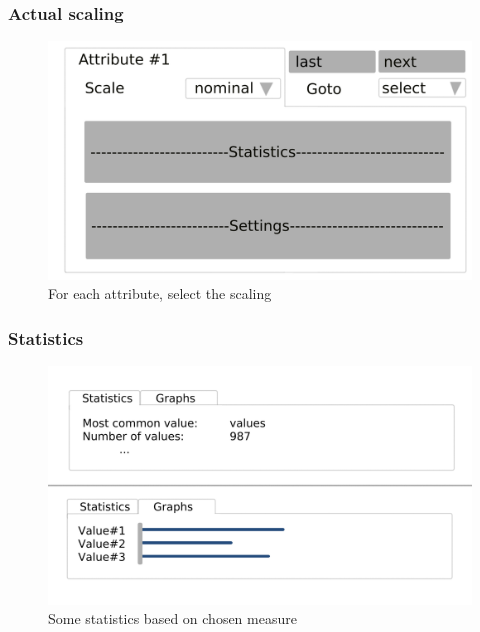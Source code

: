 \documentclass[]{beamer}
\begin{document}
	\begin{frame}
		\frametitle{Actual scaling}
		\begin{figure}[H]
			\includegraphics[width=\linewidth]{../mock_up/panel-3.png}
			\caption{For each attribute, select the scaling}
			\label{fig:p1}
		\end{figure}
	\end{frame}

	\begin{frame}
		\frametitle{Statistics}
		\begin{figure}[H]
			\includegraphics[width=\linewidth]{../mock_up/stat.png}
			\caption{Some statistics based on chosen measure}
			\label{fig:p1}
		\end{figure}
	\end{frame}
\end{document}

